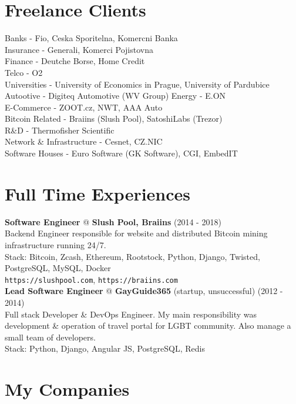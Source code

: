 \documentclass[12pt,a4paper]{article}
\begin{document}
\section*{Freelance Clients}
Banks - Fio, Ceska Sporitelna, Komercni Banka\\
Insurance - Generali, Komerci Pojistovna\\
Finance - Deutche Borse, Home Credit\\
Telco - O2\\
Universities - University of Economics in Prague, University of Pardubice\\
Autootive - Digiteq Automotive (WV Group)
Energy - E.ON\\
E-Commerce - ZOOT.cz, NWT, AAA Auto\\
Bitcoin Related - Braiins (Slush Pool), SatoshiLabs (Trezor)\\
R\&D - Thermofisher Scientific\\
Network \& Infrastructure - Cesnet, CZ.NIC\\
Software Houses - Euro Software (GK Software), CGI, EmbedIT\\

\section*{Full Time Experiences}

{\bf Software Engineer} @ {\bf Slush Pool, Braiins} (2014 - 2018)\\
Backend Engineer responsible for website and distributed Bitcoin mining infrastructure running 24/7.\\
Stack: Bitcoin, Zcash, Ethereum, Rootstock, Python, Django, Twisted, PostgreSQL, MySQL, Docker\\
\texttt{https://slushpool.com}, \texttt{https://braiins.com}\\

{\bf Lead Software Engineer} @ {\bf GayGuide365} (startup, unsuccessful) (2012 - 2014)\\
Full stack Developer \& DevOps Engineer. My main responsibility was development \& operation of travel portal for LGBT community. Also manage a small team of developers.\\
Stack: Python, Django, Angular JS, PostgreSQL, Redis\\

\pagebreak

\section*{My Companies}
\end{document}
